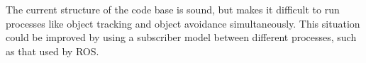 \documentclass{article}
\begin{document}

  The current structure of the code base is sound, but makes it difficult to run processes like object tracking and object avoidance simultaneously.  This situation could be improved by using a subscriber model between different processes, such as that used by ROS.




  \pagebreak


\renewcommand{\refname}{References}


%

\end{document}
